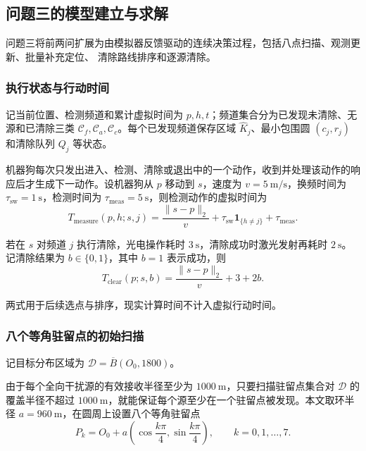 \subsection{问题三的模型建立与求解}

问题三将前两问扩展为由模拟器反馈驱动的连续决策过程，包括八点扫描、观测更新、批量补充定位、
清除路线排序和逐源清除。

\subsubsection{执行状态与行动时间}

记当前位置、检测频道和累计虚拟时间为 $p,h,t$；频道集合分为已发现未清除、无源和已清除三类
$\mathcal C_f,\mathcal C_a,\mathcal C_c$。每个已发现频道保存区域 $\widehat K_j$、最小包围圆
$(c_j,r_j)$ 和清除队列 $Q_j$ 等状态。

机器狗每次只发出进入、检测、清除或退出中的一个动作，收到并处理该动作的响应后才生成下一动作。设机器狗从 $p$ 移动到 $s$，速度为 $v=5\ \mathrm{m/s}$，换频时间为 $\tau_{\mathrm{sw}}=1\ \mathrm{s}$，检测时间为 $\tau_{\mathrm{meas}}=5\ \mathrm{s}$，则检测动作的虚拟时间为
\begin{equation}
  T_{\mathrm{measure}}(p,h;s,j)
  =\frac{\|s-p\|_2}{v}
  +\tau_{\mathrm{sw}}\mathbf 1_{\{h\ne j\}}
  +\tau_{\mathrm{meas}}.
  \label{eq:q3-measure-time}
\end{equation}

若在 $s$ 对频道 $j$ 执行清除，光电操作耗时 $3\ \mathrm{s}$，清除成功时激光发射再耗时 $2\ \mathrm{s}$。记清除结果为 $b\in\{0,1\}$，其中 $b=1$ 表示成功，则
\begin{equation}
  T_{\mathrm{clear}}(p;s,b)
  =\frac{\|s-p\|_2}{v}+3+2b.
  \label{eq:q3-clear-time}
\end{equation}

两式用于后续选点与排序，现实计算时间不计入虚拟行动时间。

\subsubsection{八个等角驻留点的初始扫描}

记目标分布区域为 $\mathcal D=\overline B(O_0,1800)$。

由于每个全向干扰源的有效接收半径至少为 $1000\ \mathrm{m}$，只要扫描驻留点集合对 $\mathcal D$ 的覆盖半径不超过 $1000\ \mathrm{m}$，就能保证每个源至少在一个驻留点被发现。本文取环半径 $a=960\ \mathrm{m}$，在圆周上设置八个等角驻留点
\begin{equation}
  P_k=O_0+a
  \left(\cos\frac{k\pi}{4},\sin\frac{k\pi}{4}\right),
  \qquad k=0,1,\ldots,7.
  \label{eq:q3-eight-points}
\end{equation}

